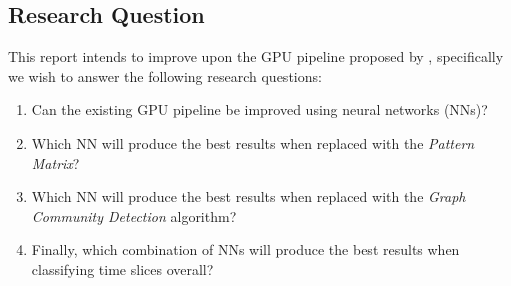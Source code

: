 \subsection{Research Question}\label{research-question}

This report intends to improve upon the GPU pipeline proposed by
\cite{karas2019data}, specifically we wish to answer the following research
questions:

\begin{enumerate}
  \item Can the existing GPU pipeline be improved using neural networks (NNs)?
  \item Which NN will produce the best results when replaced with the \emph{Pattern Matrix}?
  \item Which NN will produce the best results when replaced with the \emph{Graph Community Detection} algorithm?
  \item Finally, which combination of NNs will produce the best results when classifying time slices overall?
\end{enumerate}




